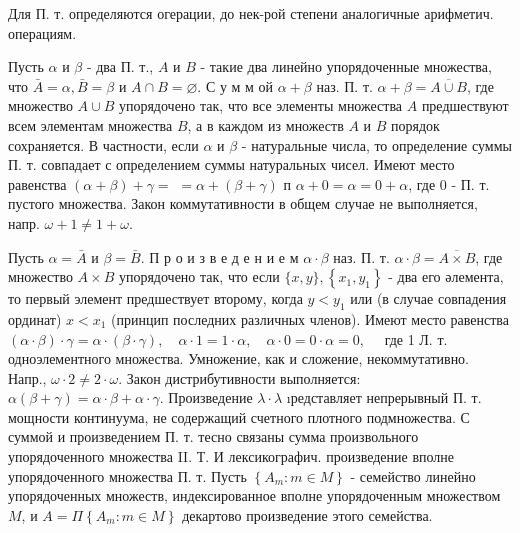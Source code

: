 \documentclass[10pt]{article}
\begin{document}
Для П. т. определяются огерации, до нек-рой степени аналогичные арифметич. операциям.



Пусть $\alpha$ и $\beta$ - два П. т., $A$ и $B$ - такие два линейно упорядоченные множества, что $\bar{A}=\alpha, \bar{B}=\beta$ и $A \cap B=\varnothing$. С у м м ой $\alpha+\beta$ наз. П. т. $\alpha+\beta=\overline{A \cup B}$, где множество $A \cup B$ упорядочено так, что все элементы множества $A$ предшествуют всем элементам множества $B$, а в каждом из множеств $A$ и $B$ порядок сохраняется. В частности, если $\alpha$ и $\beta$ - натуральные числа, то определение суммы П. т. совпадает с определением суммы натуральных чисел. Имеют место равенства $(\alpha+\beta)+\gamma=$ $=\alpha+(\beta+\gamma)$ п $\alpha+0=\alpha=0+\alpha$, где 0 - П. т. пустого множества. Закон коммутативности в общем случае не выполняется, напр. $\omega+1 \neq 1+\omega$.



Пусть $\alpha=\bar{A}$ и $\beta=\bar{B}$. П р о и з в е д е н и е м $\alpha \cdot \beta$ наз. П. т. $\alpha \cdot \beta=\overline{A \times B}$, где множество $A \times B$ упорядочено так, что если $\{x, y\},\left\{x_{1}, y_{1}\right\}$ - два его әлемента, то первый элемент предшествует второму, когда $y<y_{1}$ или (в случае совпадения ординат) $x<x_{1}$ (принцип последних различных членов). Имеют место равенства $(\alpha \cdot \beta) \cdot \gamma=\alpha \cdot(\beta \cdot \gamma), \quad \alpha \cdot 1=1 \cdot \alpha, \quad \alpha \cdot 0=0 \cdot \alpha=0, \quad$ где 1 Л. т. одноэлементного множества. Умножение, как и сложение, некоммутативно. Напр., $\omega \cdot 2 \neq 2 \cdot \omega$. Закон дистрибутивности выполняется: $\alpha(\beta+\gamma)=\alpha \cdot \beta+\alpha \cdot \gamma$. Произведение $\lambda \cdot \lambda$ ıредставляет непрерывный П. т. мощности континуума, не содержащий счетного плотного подмножества. С суммой и произведением П. т. тесно связаны сумма произвольного упорядоченного множества II. Т. И лексикографич. произведение вполне упорядоченного множества П. т. Пусть $\left\{A_{m}: m \in M\right\}$ - семейство линейно упорядоченных множеств, индексированное вполне упорядоченным множеством $M$, и $A=\Pi\left\{A_{m}: m \in M\right\}$ декартово произведение этого семейства.
\end{document}
